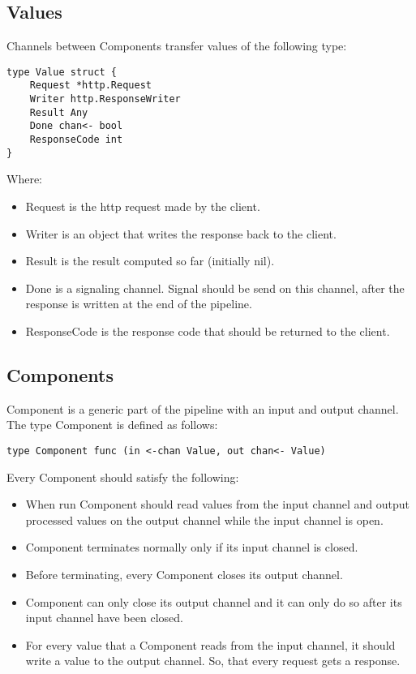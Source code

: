 \documentclass[12pt,a4paper]{article}
\begin{document}
\subsection{Values} 
Channels between Components transfer values of the following type:

\begin{lstlisting}
type Value struct {
    Request *http.Request
    Writer http.ResponseWriter
    Result Any
    Done chan<- bool
    ResponseCode int
}
\end{lstlisting}
Where:
\begin{itemize}
  \item Request is the http request made by the client.
  \item Writer is an object that writes the response back to the 	client.
  \item Result is the result computed so far (initially nil).
  \item Done is a signaling channel. Signal should be send on this channel,
		after the response is written at the end of the pipeline.
  \item ResponseCode is the response code that should be returned to the client.
\end{itemize}

\subsection{Components}
Component is a generic part of the pipeline with an input and output channel.
The type Component is defined as follows:

\begin{lstlisting}
type Component func (in <-chan Value, out chan<- Value)
\end{lstlisting}

Every Component should satisfy the following:
\begin{itemize}
  \item When run Component should read values from the input channel
				and output processed values on the output channel while the input 
				channel is open.
	\item Component terminates normally only if its input channel is closed.
	\item Before terminating, every Component closes its output channel.
	\item Component can only close its output channel and it can only do so
				after its input channel have been closed.
	\item For every value that a Component reads from the input channel, 
				it should write a value to the output channel. So, that every request 
				gets a response.
  
\end{itemize}
\end{document}
